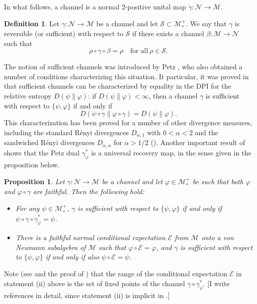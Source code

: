 \documentclass[12pt]{article}
\newtheorem{prop}[theorem]{Proposition}
\theoremstyle{definition}
\newtheorem{defi}[theorem]{Definition}
\theoremstyle{remark}
\numberwithin{equation}{section}
\def\Me{\mathcal M}
\def\Ne{\mathcal N}
\def\ffi{\varphi}
\begin{document}
In what follows, a channel is a normal 2-positive unital map $\gamma: \Ne\to \Me$.

\begin{defi} Let $\gamma:\Ne\to \Me$ be a channel and let $\mathcal S \subset
\Me_*^+$. We say that $\gamma$ is reversible (or sufficient) with respect to $\mathcal S$
if there exists a channel $\beta:\Me\to \Ne$ such that
\[
\rho\circ\gamma\circ\beta=\rho\quad\mbox{for all}\ \rho\in \mathcal S.
\]
\end{defi}

The notion of sufficient channels was introduced by Petz
\cite{petz1986sufficient,petz1988sufficiency}, who also obtained a number of conditions
characterizing this situation. It particular, it was proved in \cite{petz1988sufficiency}
that sufficient channels can be characterized by equality in {\color{red}the} DPI for the relative entropy
$D(\psi\|\varphi)$: if $D(\psi\|\varphi)<\infty$, then a channel $\gamma$ is sufficient
with respect to $\{\psi,\varphi\}$ if and only if 
\[
D(\psi\circ\gamma\|\varphi\circ\gamma)=D(\psi\|\varphi). 
\]
This characterization has been proved for a number of other divergence measures, including the
standard R\'enyi divergences $D_{\alpha,1}$ with $0<\alpha<2$  and the sandwiched
R\'enyi divergences $D_{\alpha,\alpha}$ for $\alpha>1/2$
(\cite{hiai2021quantum,jencova2018renyi,jencova2021renyi}).
Another important result of \cite{petz1988sufficiency} shows that the Petz dual $\gamma_\varphi^*$
is a universal recovery map, in the sense given in the proposition below. 

\begin{prop}\label{prop:universal}
Let $\gamma:\Ne\to \Me$ be a channel and let $\varphi\in \Me_*^+$ be such that both $\ffi$ and
$\ffi\circ\gamma$ are faithful. Then the following hold:
\begin{itemize}
\item[(i)] For any $\psi\in \Me_*^+$, $\gamma$ is sufficient with respect to $\{\psi,\varphi\}$ if and only
if $\psi\circ\gamma\circ\gamma_\varphi^*=\psi$.

\item[(ii)]
There is a faithful normal conditional expectation $\mathcal E$ from $\Me$ onto a von Neumann
subalgebra of $\Me$ such that $\varphi\circ \mathcal E=\varphi$, and $\gamma$ is sufficient with
respect to $\{\psi,\varphi\}$ if and only if also $\psi\circ\mathcal E=\psi$.
\end{itemize}
\end{prop}

Note {\color{red}(see \cite[Theorem 2]{petz1988sufficiency} and the proof of
\cite[Theorem 3]{petz1988sufficiency})}
that the range of the conditional expectation $\mathcal E$ in statement (ii) above is the set of
fixed points of the channel $\gamma\circ\gamma_\varphi^*$.
{\color{red}[I write references in detail, since statement (ii) is implicit in \cite{petz1988sufficiency}.]}
\end{document}
